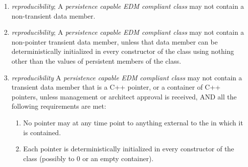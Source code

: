 \documentclass[draftmode]{memarticle}
\newcommand{\EDProduct}{\classname{ED\-Product}}
\begin{document}
\begin{enumerate}
	\item \emph{reproducibility}; A \emph{persistence capable EDM compliant class} may not contain a non-transient  data member.

	\item \emph{reproducibility}; A \emph{persistence capable EDM compliant class} may not contain a non-pointer transient data member, unless that data member can be deterministically initialized in every constructor of the class using nothing other than the values of persistent members of the class.

	\item \emph{reproducibility} A \emph{persistence capable EDM compliant class} may not contain a transient data member that is a C++ pointer, or a container of C++ pointers, unless management or architect approval is received, AND all the following requirements are met:
	\begin{enumerate}
		\item No pointer may at any time point to anything external to the \EDProduct in which it is contained.

		\item Each pointer is deterministically initialized in every constructor of the class (possibly to 0 or an empty container).
	\end{enumerate}


\end{enumerate}
\end{document}
